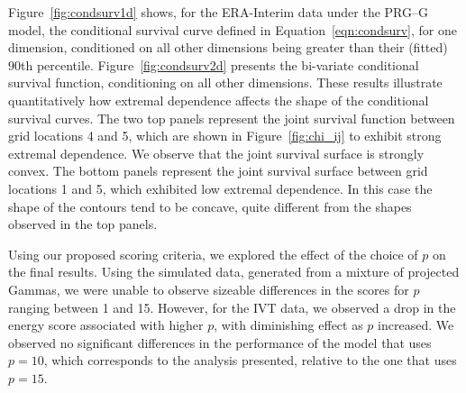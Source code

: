 Figure~\ref{fig:condsurv1d} shows, for the ERA-Interim data under the PRG--G model,  
    the conditional survival curve defined in Equation~\ref{eqn:condsurv}, for one dimension, 
    conditioned on all other dimensions being greater than their (fitted) $90$th percentile. 
    Figure~\ref{fig:condsurv2d} presents the bi-variate conditional survival function,
    conditioning on all other dimensions.  These results illustrate quantitatively how extremal dependence
    affects the shape of the conditional survival curves.  The two top panels represent the joint survival function 
    between grid locations 4 and 5, which are shown in Figure~\ref{fig:chi_ij} to exhibit strong
    extremal dependence.  We observe that the joint survival surface 
    is strongly convex.  The bottom panels represent the joint survival surface between grid locations 1 and 5, 
    which exhibited low extremal dependence.  In this case the shape of the contours tend to be concave, quite different from the shapes observed in the top panels.

Using our proposed scoring criteria, we explored the effect of the choice of $p$ on the final results. Using the simulated data, generated
    from a mixture of projected Gammas, we were unable to observe sizeable differences in the scores for $p$ 
    ranging between 1 and 15.   However, 
    for the IVT data, we observed a drop in the energy score associated 
    with higher $p$, with diminishing effect as $p$ increased.  
    We observed no significant differences in the performance
    of the model that uses $p=10$, which corresponds to the analysis 
    presented, relative to the one that uses $p=15$.
